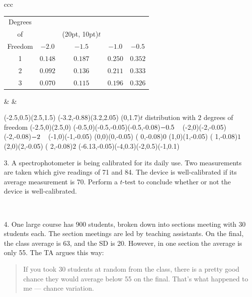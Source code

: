 \documentclass[10pt]{article}
\begin{document}
\begin{tabular}{ccc}
\begin{tabular}{|c|cccc|}\hline
Degrees\vphantom{\LARGE Y} & &&&\\
of      & &\rput(20pt, 10pt){$t$}&&\\
Freedom & $-2.0$ & $-1.5$ & $-1.0$ & $-0.5$\\[3pt]\hline
1       & $0.148$ & $0.187$ & $0.250$ & $0.352$\vphantom{\LARGE Y}\\
2       & $0.092$ & $0.136$ & $0.211$ & $0.333$\\
3       & $0.070$ & $0.115$ & $0.196$ & $0.326$\\\hline
\end{tabular}
&\hspace{1in} &
\begin{pspicture}(-2.5,0.5)(2.5,1.5)
\psframe[linewidth=0.02](-3.2,-0.88)(3.2,2.05)
\rput(0,1.7){$t$ distribution with $2$ degrees of freedom}
\psline{<->}(-2.5,0)(2.5,0)
\psline(-0.5,0)(-0.5,-0.05)\rput[t](-0.5,-0.08){\footnotesize$-0.5\hphantom{-}$}
\psline(-2,0)(-2,-0.05)    \rput[t](-2,-0.08){\footnotesize$-2\hphantom{-}$}
\psline(-1,0)(-1,-0.05)   %
\psline(0,0)(0,-0.05)      \rput[t]( 0,-0.08){\footnotesize$0$}
\psline(1,0)(1,-0.05)      \rput[t]( 1,-0.08){\footnotesize$1$}
\psline(2,0)(2,-0.05)      \rput[t]( 2,-0.08){\footnotesize$2$}
\psbezier{->}(-6.13,-0.05)(-4,0.3)(-2,0.5)(-1,0.1)
\end{pspicture}
\end{tabular}
\bigskip
\bigskip

3. A spectrophotometer is being calibrated for its daily use.  Two measurements are
taken which give readings of 71 and 84.  The device is well-calibrated if its
average measurement is 70.  Perform a $t$-test to conclude whether or not the 
device is well-calibrated.
\vfill
\eject

{\ }

4.  One large course has 900 students, broken down into sections meeting with
30 students each.  The section meetings are led by teaching assistants.  On the final, the
class average is 63, and the SD is 20.  However, in one section the 
average is only 55.  The TA argues this way:

\begin{quote}
If you took 30 students at random from the class, there is a pretty good chance 
they would average
below 55 on the final.  That's what happened to me --- chance variation.
\end{quote}
\end{document}
